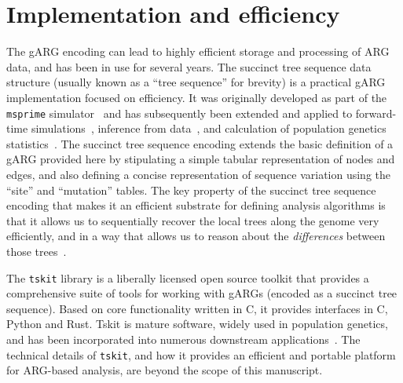 \documentclass[9pt,twocolumn,twoside]{gsajnl}
\begin{document}
\section{Implementation and efficiency}
\label{sec-efficiency}
The gARG encoding can lead to highly efficient storage and processing of ARG data,
and has been in use for several years.
The succinct tree sequence data structure
(usually known as a ``tree sequence'' for brevity)
is a practical gARG implementation focused on efficiency.
It was originally developed as part of the \texttt{msprime}
simulator~\citep{kelleher2016efficient} and has subsequently been
extended and applied to forward-time
simulations~\citep{kelleher2018efficient,haller2018tree},
inference from
data~\citep{kelleher2019inferring,wohns2022unified,zhan2023towards},
and calculation of population genetics statistics~\citep{ralph2020efficiently}.
The succinct tree sequence encoding extends the basic definition
of a gARG provided here by stipulating a
simple tabular representation of nodes and edges,
and also defining a concise representation of
sequence variation using the ``site'' and  ``mutation'' tables.
The key property of the succinct tree sequence encoding
that makes it an efficient substrate for defining analysis
algorithms is that it allows us to sequentially
recover the local trees along the genome very efficiently,
and in a way that allows us to reason about the \emph{differences}
between those trees~\citep{kelleher2016efficient,ralph2020efficiently}.

The \texttt{tskit} library is a liberally
licensed open source toolkit that provides a comprehensive suite
of tools for working with gARGs (encoded as a succinct tree sequence).
Based on core functionality written
in C, it provides interfaces in C, Python and Rust.
Tskit is mature software, widely used in population genetics, and
has been incorporated into numerous downstream
applications~\citep[e.g.,][]{haller2019slim,speidel2019method,
adrion2020community,
terasaki2021geonomics,
baumdicker2021efficient,
fan2022genealogical,
guo2022recombination,
korfmann2022weak,
mahmoudi2022bayesian,
petr2023slendr,
rasmussen2022espalier,
zhang2023biobank,
nowbandegani2023extremely,
ignatieva2023distribution,
fan2023likelihood,
tsambos2023link,
tagami2024tstrait,
korfmann2024simultaneous}.
The technical details of \texttt{tskit}, and how it provides an
efficient and portable platform for ARG-based analysis, are beyond
the scope of this manuscript.
\end{document}
